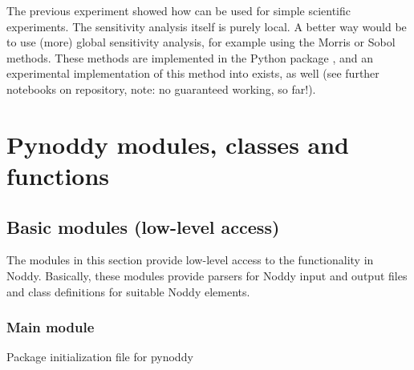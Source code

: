 \documentclass[a4paper,10pt,english]{sphinxmanual}
\begin{document}
The previous experiment showed how  can be used for simple
scientific experiments. The sensitivity analysis itself is purely local.
A better way would be to use (more) global sensitivity analysis, for
example using the Morris or Sobol methods. These methods are implemented
in the Python package , and an experimental implementation of
this method into  exists, as well (see further notebooks on
repository, note: no guaranteed working, so far!).


\chapter{Pynoddy modules, classes and functions}
\label{pynoddy::doc}\label{pynoddy:pynoddy-modules-classes-and-functions}

\section{Basic modules (low-level access)}
\label{pynoddy:basic-modules-low-level-access}
The modules in this section provide low-level access to the functionality
in Noddy. Basically, these modules provide parsers for Noddy input and
output files and class definitions for suitable Noddy elements.


\subsection{Main module}
\label{pynoddy:main-module}\label{pynoddy:module-pynoddy}
Package initialization file for pynoddy
\end{document}
